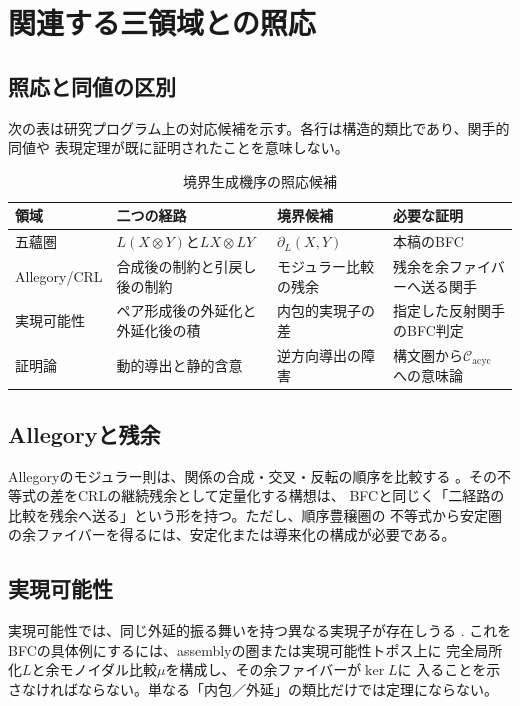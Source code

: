 \documentclass[11pt,a4paper]{ltjsarticle}
\theoremstyle{definition}
\theoremstyle{remark}
\newcommand{\Cacyc}{\mathcal{C}_{\mathrm{acyc}}}
\newcommand{\Boundary}{\partial_L}
\begin{document}
\section{関連する三領域との照応}

\subsection{照応と同値の区別}

次の表は研究プログラム上の対応候補を示す。各行は構造的類比であり、関手的同値や
表現定理が既に証明されたことを意味しない。

\begin{table}[htbp]
\centering
\caption{境界生成機序の照応候補}
\scriptsize
\begin{tabularx}{\textwidth}{@{}l >{\raggedright\arraybackslash}X >{\raggedright\arraybackslash}X >{\raggedright\arraybackslash}X@{}}
\toprule
領域 & 二つの経路 & 境界候補 & 必要な証明 \\
\midrule
五蘊圏 & $L(X\otimes Y)$と$LX\otimes LY$ & $\Boundary(X,Y)$ & 本稿のBFC \\
Allegory/CRL & 合成後の制約と引戻し後の制約 & モジュラー比較の残余 & 残余を余ファイバーへ送る関手 \\
実現可能性 & ペア形成後の外延化と外延化後の積 & 内包的実現子の差 & 指定した反射関手のBFC判定 \\
証明論 & 動的導出と静的含意 & 逆方向導出の障害 & 構文圏から$\Cacyc$への意味論 \\
\bottomrule
\end{tabularx}
\end{table}

\subsection{Allegoryと残余}

Allegoryのモジュラー則は、関係の合成・交叉・反転の順序を比較する
\cite{FreydScedrov1990}。その不等式の差をCRLの継続残余として定量化する構想は、
BFCと同じく「二経路の比較を残余へ送る」という形を持つ。ただし、順序豊穣圏の
不等式から安定圏の余ファイバーを得るには、安定化または導来化の構成が必要である。

\subsection{実現可能性}

実現可能性では、同じ外延的振る舞いを持つ異なる実現子が存在しうる
\cite{Kleene1952}. これをBFCの具体例にするには、assemblyの圏または実現可能性トポス上に
完全局所化$L$と余モノイダル比較$\mu$を構成し、その余ファイバーが$\ker L$に
入ることを示さなければならない。単なる「内包／外延」の類比だけでは定理にならない。
\end{document}

